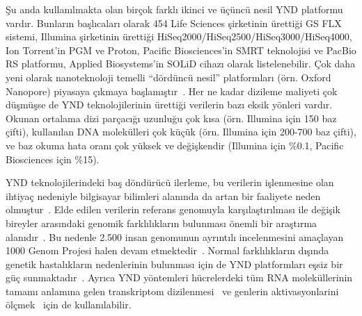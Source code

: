 \documentclass[11pt]{article}
\begin{document}
Şu anda kullanılmakta olan birçok farklı ikinci ve üçüncü nesil YND platformu vardır. Bunların başlıcaları olarak 454 Life Sciences şirketinin ürettiği GS FLX sistemi, Illumina şirketinin ürettiği HiSeq2000/HiSeq2500/HiSeq3000/HiSeq4000, Ion Torrent'in PGM ve Proton, Pacific Biosciences'in SMRT teknolojisi ve PacBio RS platformu, Applied Biosystems'in SOLiD cihazı olarak listelenebilir. Çok daha yeni olarak nanoteknoloji temelli ``dördüncü nesil'' platformları (örn. Oxford Nanopore) piyasaya çıkmaya başlamıştır~\cite{Metzker2010,Loman2015}. Her ne kadar dizileme maliyeti çok düşmüşse de YND teknolojilerinin ürettiği verilerin bazı eksik yönleri vardır. Okunan ortalama dizi parçacığı uzunluğu çok kısa (örn. Illumina için 150 baz çifti), kullanılan DNA molekülleri çok küçük (örn. Illumina için 200-700 baz çifti), ve baz okuma hata oranı çok yüksek ve değişkendir (Illumina için \%0.1, Pacific Biosciences için \%15).


YND teknolojilerindeki baş döndürücü ilerleme, bu verilerin işlenmesine olan ihtiyaç nedeniyle bilgisayar bilimleri alanında da artan bir faaliyete neden olmuştur~\cite{Pop2008}. Elde edilen verilerin referans genomuyla karşılaştırılması ile değişik bireyler arasındaki genomik farklılıkların bulunması önemli bir araştırma alanıdır~\cite{Alkan2011,DePristo2011}. Bu nedenle 2.500 insan genomunun ayrıntılı incelenmesini amaçlayan 1000 Genom Projesi halen devam etmektedir~\cite{1000GP,1000GP2012}. Normal farklılıkların dışında genetik hastalıkların nedenlerinin bulunması için de YND platformları eşsiz bir güç sunmaktadır~\cite{Bamshad2011}. Ayrıca YND yöntemleri hücrelerdeki tüm RNA moleküllerinin tamamı anlamına gelen transkriptom dizilenmesi~\cite{Wang2009} ve genlerin aktivasyonlarini ölçmek~\cite{Park2009} için de kullanılabilir. 
\end{document}
